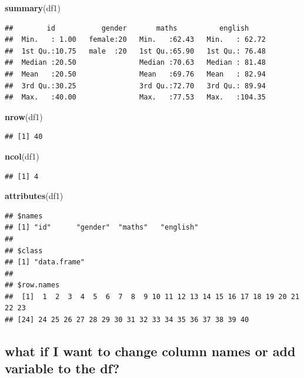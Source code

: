 \documentclass[]{book}
\newenvironment{Shaded}{\begin{snugshade}}{\end{snugshade}}
\newcommand{\KeywordTok}[1]{\textcolor[rgb]{0.13,0.29,0.53}{\textbf{#1}}}
\newcommand{\NormalTok}[1]{#1}
\begin{document}
\begin{Shaded}
\begin{Highlighting}[]
\KeywordTok{summary}\NormalTok{(df1)}
\end{Highlighting}
\end{Shaded}

\begin{verbatim}
##        id           gender       maths          english      
##  Min.   : 1.00   female:20   Min.   :62.43   Min.   : 62.72  
##  1st Qu.:10.75   male  :20   1st Qu.:65.90   1st Qu.: 76.48  
##  Median :20.50               Median :70.63   Median : 81.48  
##  Mean   :20.50               Mean   :69.76   Mean   : 82.94  
##  3rd Qu.:30.25               3rd Qu.:72.70   3rd Qu.: 89.94  
##  Max.   :40.00               Max.   :77.53   Max.   :104.35
\end{verbatim}

\begin{Shaded}
\begin{Highlighting}[]
\KeywordTok{nrow}\NormalTok{(df1)}
\end{Highlighting}
\end{Shaded}

\begin{verbatim}
## [1] 40
\end{verbatim}

\begin{Shaded}
\begin{Highlighting}[]
\KeywordTok{ncol}\NormalTok{(df1)}
\end{Highlighting}
\end{Shaded}

\begin{verbatim}
## [1] 4
\end{verbatim}

\begin{Shaded}
\begin{Highlighting}[]
\KeywordTok{attributes}\NormalTok{(df1)}
\end{Highlighting}
\end{Shaded}

\begin{verbatim}
## $names
## [1] "id"      "gender"  "maths"   "english"
## 
## $class
## [1] "data.frame"
## 
## $row.names
##  [1]  1  2  3  4  5  6  7  8  9 10 11 12 13 14 15 16 17 18 19 20 21 22 23
## [24] 24 25 26 27 28 29 30 31 32 33 34 35 36 37 38 39 40
\end{verbatim}

\subsection{what if I want to change column names or add variable to the
df?}\label{what-if-i-want-to-change-column-names-or-add-variable-to-the-df}
\end{document}
